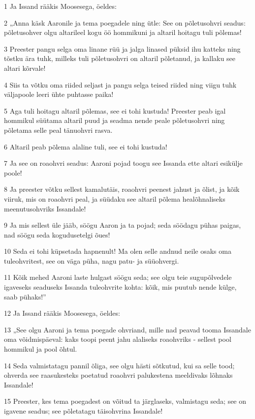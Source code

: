 \par 1 Ja Issand rääkis Moosesega, öeldes:
\par 2 „Anna käsk Aaronile ja tema poegadele ning ütle: See on põletusohvri seadus: põletusohver olgu altarileel kogu öö hommikuni ja altaril hoitagu tuli põlemas!
\par 3 Preester pangu selga oma linane rüü ja jalga linased püksid ihu katteks ning tõstku ära tuhk, milleks tuli põletusohvri on altaril põletanud, ja kallaku see altari kõrvale!
\par 4 Siis ta võtku oma riided seljast ja pangu selga teised riided ning viigu tuhk väljapoole leeri ühte puhtasse paika!
\par 5 Aga tuli hoitagu altaril põlemas, see ei tohi kustuda! Preester peab igal hommikul süütama altaril puud ja seadma nende peale põletusohvri ning põletama selle peal tänuohvri rasva.
\par 6 Altaril peab põlema alaline tuli, see ei tohi kustuda!
\par 7 Ja see on roaohvri seadus: Aaroni pojad toogu see Issanda ette altari esikülje poole!
\par 8 Ja preester võtku sellest kamalutäis, roaohvri peenest jahust ja õlist, ja kõik viiruk, mis on roaohvri peal, ja süüdaku see altaril põlema healõhnaliseks meenutusohvriks Issandale!
\par 9 Ja mis sellest üle jääb, söögu Aaron ja ta pojad; seda söödagu pühas paigas, nad söögu seda kogudusetelgi õues!
\par 10 Seda ei tohi küpsetada hapnenult! Ma olen selle andnud neile osaks oma tuleohvritest, see on väga püha, nagu patu- ja süüohvergi.
\par 11 Kõik mehed Aaroni laste hulgast söögu seda; see olgu teie sugupõlvedele igaveseks seaduseks Issanda tuleohvrite kohta: kõik, mis puutub nende külge, saab pühaks!”
\par 12 Ja Issand rääkis Moosesega, öeldes:
\par 13 „See olgu Aaroni ja tema poegade ohvriand, mille nad peavad tooma Issandale oma võidmispäeval: kaks toopi peent jahu alaliseks roaohvriks - sellest pool hommikul ja pool õhtul.
\par 14 Seda valmistatagu pannil õliga, see olgu hästi sõtkutud, kui sa selle tood; ohverda see raasukesteks poetatud roaohvri palukestena meeldivaks lõhnaks Issandale!
\par 15 Preester, kes tema poegadest on võitud ta järglaseks, valmistagu seda; see on igavene seadus; see põletatagu täisohvrina Issandale!
